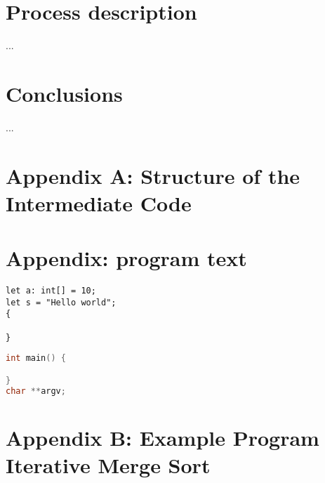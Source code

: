 \documentclass[a4paper]{article}
\begin{document}
\section{Process description}

...

\section{Conclusions}

...

\section{Appendix A: Structure of the Intermediate Code}
\label{appendix_a}

\section{Appendix: program text}




\begin{lstlisting}[language=DPL]
let a: int[] = 10;
let s = "Hello world";
{

}
\end{lstlisting}

\begin{lstlisting}[language=C]
int main() {

}
char **argv;
\end{lstlisting}


\clearpage
\section{Appendix B: Example Program Iterative Merge Sort}
\label{appendix_b}
\end{document}
